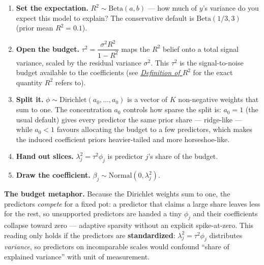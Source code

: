 \documentclass[
  letterpaper,
  DIV=11,
  numbers=noendperiod]{scrartcl}
\begin{document}
\begin{enumerate}
\def\labelenumi{\arabic{enumi}.}
\item
  \textbf{Set the expectation.} \(R^2 \sim \text{Beta}(a, b)\) --- how
  much of \(y\)'s variance do you expect this model to explain? The
  conservative default is \(\text{Beta}(1/3, 3)\) (prior mean
  \(R^2 = 0.1\)).
\item
  \textbf{Open the budget.} \(\tau^2 = \dfrac{\sigma^2 R^2}{1 - R^2}\)
  maps the \(R^2\) belief onto a total signal variance, scaled by the
  residual variance \(\sigma^2\). This \(\tau^2\) is the signal-to-noise
  budget available to the coefficients (see
  \hyperref[sec-r2-definition]{\emph{Definition of \(R^2\)}} for the
  exact quantity \(R^2\) refers to).
\item
  \textbf{Split it.} \(\phi \sim \text{Dirichlet}(a_0, \dots, a_0)\) is
  a vector of \(K\) non-negative weights that sum to one. The
  concentration \(a_0\) controls how sparse the split is: \(a_0 = 1\)
  (the usual default) gives every predictor the same prior share ---
  ridge-like --- while \(a_0 < 1\) favours allocating the budget to a
  few predictors, which makes the induced coefficient priors
  heavier-tailed and more horseshoe-like.
\item
  \textbf{Hand out slices.} \(\lambda_j^2 = \tau^2 \phi_j\) is predictor
  \(j\)'s share of the budget.
\item
  \textbf{Draw the coefficient.}
  \(\beta_j \sim \text{Normal}(0, \lambda_j^2)\).
\end{enumerate}

\begin{tcolorbox}[enhanced jigsaw, titlerule=0mm, arc=.35mm, leftrule=.75mm, colback=white, bottomtitle=1mm, toptitle=1mm, colbacktitle=quarto-callout-note-color!10!white, colframe=quarto-callout-note-color-frame, opacitybacktitle=0.6, bottomrule=.15mm, opacityback=0, toprule=.15mm, left=2mm, title=\textcolor{quarto-callout-note-color}{\faInfo}\hspace{0.5em}{Note}, rightrule=.15mm, breakable, coltitle=black]

\textbf{The budget metaphor.} Because the Dirichlet weights sum to one,
the predictors \emph{compete} for a fixed pot: a predictor that claims a
large share leaves less for the rest, so unsupported predictors are
handed a tiny \(\phi_j\) and their coefficients collapse toward zero ---
adaptive sparsity without an explicit spike-at-zero. This reading only
holds if the predictors are \textbf{standardized}:
\(\lambda_j^2 = \tau^2\phi_j\) distributes \emph{variance}, so
predictors on incomparable scales would confound ``share of explained
variance'' with unit of measurement.

\end{tcolorbox}
\end{document}
